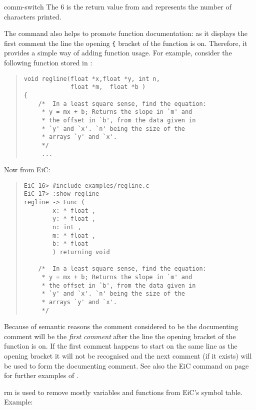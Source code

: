 \begin{Ventry}{comm-switch }
The 6 is the return value from 
and represents the number of characters printed.

The  command also helps to promote function
documentation: as it
displays the first comment  the line the opening {\tt \{}
bracket of the function is on. Therefore, it provides a simple way of
adding function usage. For example, consider the following function
stored in :

\begin{quote}
\begin{verbatim}
void regline(float *x,float *y, int n,     
             float *m,  float *b )
{
    /*  In a least square sense, find the equation:
     * y = mx + b; Returns the slope in `m' and
     * the offset in `b', from the data given in
     * `y' and `x'. `n' being the size of the
     * arrays `y' and `x'.
     */
     ...
\end{verbatim}
\end{quote}

Now from EiC:

\begin{quote}
\begin{verbatim}
EiC 16> #include examples/regline.c
EiC 17> :show regline
regline -> Func (
        x: * float ,
        y: * float ,
        n: int ,
        m: * float ,
        b: * float 
        ) returning void 

    /*  In a least square sense, find the equation:
     * y = mx + b; Returns the slope in `m' and
     * the offset in `b', from the data given in
     * `y' and `x'. `n' being the size of the
     * arrays `y' and `x'.
     */
\end{verbatim}
\end{quote}

Because of semantic reasons the comment considered to be the
documenting comment will be the {\it first comment} after the line
the opening bracket of the function is on. If the first comment
happens to start on the same line as the opening bracket it will not
be recognised and the next comment (if it exists) will be used to form
the documenting comment. See also the EiC command
 on page \pageref{item:listcode} for further examples of
.

\item[rm] 
\label{item:rm}
        is used to remove mostly variables and functions from EiC's
        symbol table. Example:


\end{Ventry}

